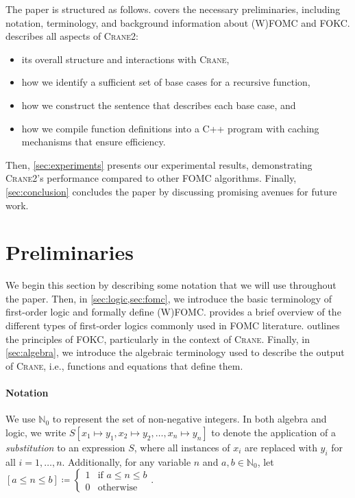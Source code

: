\documentclass[a4paper,UKenglish,cleveref,autoref]{lipics-v2021}
\newcommand{\Cranetwo}{\textsc{Crane2}}
\begin{document}
The paper is structured as follows.  covers the
necessary preliminaries, including notation, terminology, and background
information about (W)FOMC and FOKC\@.  describes all aspects of
\Cranetwo{}:
\begin{itemize}
  \item its overall structure and interactions with \textsc{Crane},
  \item how we identify a sufficient set of base cases for a recursive function,
  \item how we construct the sentence that describes each base case, and
  \item how we compile function definitions into a C++ program with caching
        mechanisms that ensure efficiency.
\end{itemize}
Then, \cref{sec:experiments} presents our experimental results, demonstrating
\Cranetwo{}'s performance compared to other FOMC algorithms. Finally,
\cref{sec:conclusion} concludes the paper by discussing promising avenues for
future work.

\section{Preliminaries}\label{sec:preliminaries}

We begin this section by describing some notation that we will use throughout
the paper. Then, in \cref{sec:logic,sec:fomc}, we introduce the basic
terminology of first-order logic and formally define (W)FOMC\@.
 provides a brief overview of the different types of
first-order logics commonly used in FOMC literature.  outlines
the principles of FOKC, particularly in the context of \textsc{Crane}. Finally,
in \cref{sec:algebra}, we introduce the algebraic terminology used to describe
the output of \textsc{Crane}, i.e., functions and equations that define them.

\paragraph*{Notation}
We use $\mathbb{N}_{0}$ to represent the set of non-negative integers. In both
algebra and logic, we write
$S[x_{1} \mapsto y_{1}, x_{2} \mapsto y_{2}, \dots, x_{n} \mapsto y_{n}]$ to
denote the application of a \emph{substitution} to an expression $S$, where all
instances of $x_{i}$ are replaced with $y_{i}$ for all $i = 1, \dots, n$.
Additionally, for any variable $n$ and $a, b \in \mathbb{N}_{0}$, let
$[a \le n \le b] \coloneqq \begin{cases}
  1 & \text{if $a \le n \le b$} \\
  0 & \text{otherwise}
\end{cases}$.
\end{document}
